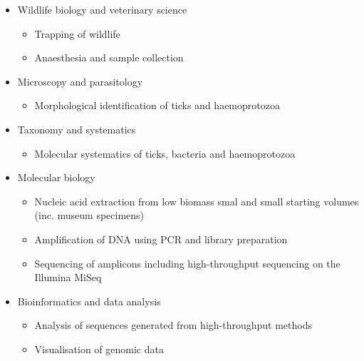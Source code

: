 \documentclass[a4paper, nobind]{templates/ociamthesis}
\providecommand{\tightlist}{%
  \setlength{\itemsep}{0pt}\setlength{\parskip}{0pt}}
\begin{document}
\begin{itemize}
\tightlist
\item
  Wildlife biology and veterinary science

  \begin{itemize}
  \tightlist
  \item
    Trapping of wildlife
  \item
    Anaesthesia and sample collection
  \end{itemize}
\item
  Microscopy and parasitology

  \begin{itemize}
  \tightlist
  \item
    Morphological identification of ticks and haemoprotozoa
  \end{itemize}
\item
  Taxonomy and systematics

  \begin{itemize}
  \tightlist
  \item
    Molecular systematics of ticks, bacteria and haemoprotozoa
  \end{itemize}
\item
  Molecular biology

  \begin{itemize}
  \tightlist
  \item
    Nucleic acid extraction from low biomass smal and small starting volumes (inc. museum specimens)
  \item
    Amplification of DNA using PCR and library preparation
  \item
    Sequencing of amplicons including high-throughput sequencing on the Illumina MiSeq
  \end{itemize}
\item
  Bioinformatics and data analysis

  \begin{itemize}
  \tightlist
  \item
    Analysis of sequences generated from high-throughput methods
  \item
    Visualisation of genomic data
  \end{itemize}
\end{itemize}
\end{document}
